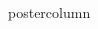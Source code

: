 \documentclass[final,hyperref={pdfpagelabels=false}]{beamer}
\newlength{\columnheight}
\begin{document}
\begin{frame}
\begin{columns}
\begin{column}{.49\textwidth}
\begin{beamercolorbox}[center,wd=\textwidth]{postercolumn}
			
			
			
      \end{beamercolorbox}
    \end{column}

    \begin{column}{.49\textwidth}


\end{column}
\end{columns}
\end{frame}
\end{document}
